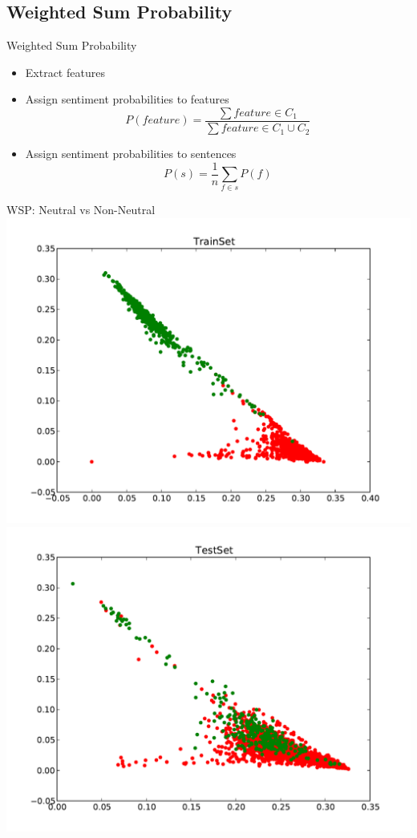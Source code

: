\documentclass{beamer}
\begin{document}
\subsection{Weighted Sum Probability}
\begin{frame}{Weighted Sum Probability}
\begin{itemize}
\item Extract features
\item Assign sentiment probabilities to features
\begin{equation}
P(feature) = \frac{ \sum feature \in C_1}{\sum feature \in C_1\cup C_2}
\end{equation}
\item Assign sentiment probabilities to sentences
\begin{equation}
P(s) = \frac{1}{n} \sum_{f \in s} P(f)
\end{equation}
\end{itemize}
\end{frame}

\begin{frame}{WSP: Neutral vs Non-Neutral}
\centering
\includegraphics[scale=0.25]{NeuNonNeuScatter1.pdf}
\includegraphics[scale=0.25]{NeuNonNeuScatter2.pdf}
\end{frame}
\end{document}
